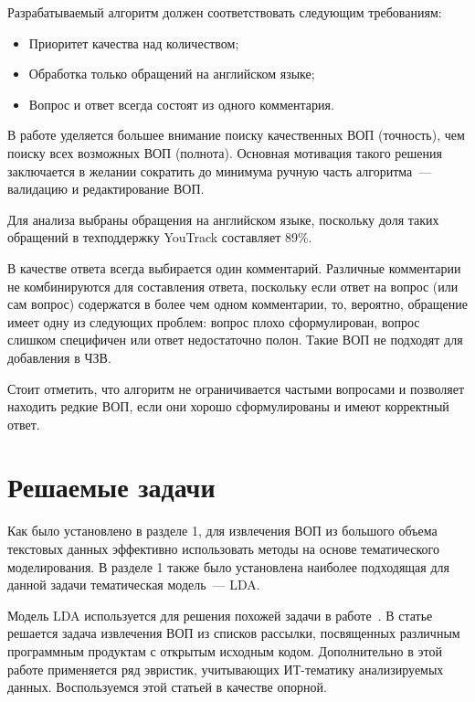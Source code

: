 Разрабатываемый алгоритм должен соответствовать следующим требованиям:

\begin{itemize}
\item Приоритет качества над количеством;
\item Обработка только обращений на английском языке;
\item Вопрос и ответ всегда состоят из одного комментария.
\end{itemize}

В работе уделяется большее внимание поиску качественных ВОП (точность), чем поиску всех возможных ВОП (полнота). Основная мотивация такого решения заключается в желании сократить до минимума ручную часть алгоритма~--- валидацию и редактирование ВОП.

Для анализа выбраны обращения на английском языке, поскольку доля таких обращений в техподдержку YouTrack составляет 89\%. 

В качестве ответа всегда выбирается один комментарий. Различные комментарии не комбинируются для составления ответа, поскольку если ответ на вопрос (или сам вопрос) содержатся в более чем одном комментарии, то, вероятно, обращение имеет одну из следующих проблем: вопрос плохо сформулирован, вопрос слишком специфичен или ответ недостаточно полон. Такие ВОП не подходят для добавления в ЧЗВ.

Стоит отметить, что  алгоритм не ограничивается частыми вопросами и позволяет находить редкие ВОП, если они хорошо сформулированы и имеют корректный ответ.

\section{Решаемые задачи}
\label{sec:tasks}

Как было установлено в разделе 1, для извлечения ВОП из большого объема текстовых данных эффективно использовать методы на основе тематического моделирования. В разделе 1 также было установлена наиболее подходящая для данной задачи тематическая модель~--- LDA.

Модель LDA используется для решения похожей задачи в работе~\cite{original}. В статье~\cite{original} решается задача извлечения ВОП из списков рассылки, посвященных различным программным продуктам с открытым исходным кодом. Дополнительно в этой работе применяется ряд эвристик, учитывающих ИТ-тематику анализируемых данных. Воспользуемся этой статьей в качестве опорной.

